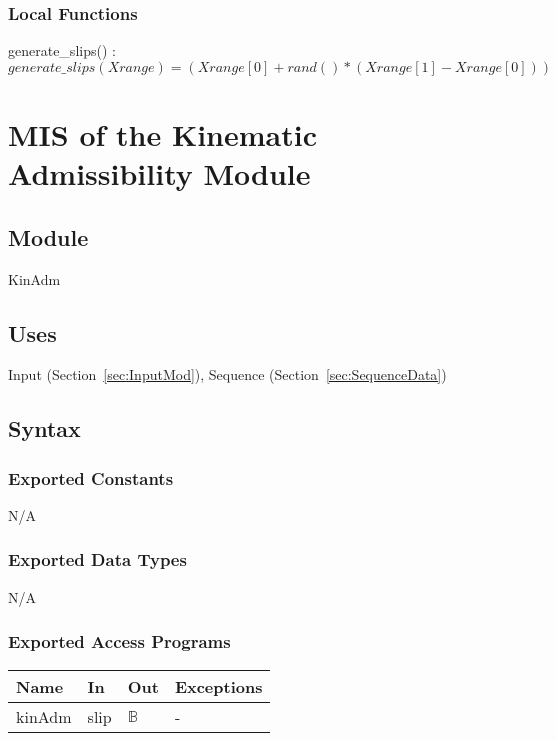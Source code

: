 \documentclass[12pt, titlepage]{article}
\begin{document}
\subsubsection{Local Functions}
generate\_slips() : 
\begin{equation*}
generate\_slips(Xrange) = (Xrange[0] + rand()*(Xrange[1] - Xrange[0]))
\end{equation*}


\section{MIS of the Kinematic Admissibility
	Module} \label{sec:KinAdmMod}

\subsection{Module}
KinAdm

\subsection{Uses}
Input (Section~\ref{sec:InputMod}), Sequence (Section~\ref{sec:SequenceData})

\subsection{Syntax}

\subsubsection{Exported Constants}
N/A

\subsubsection{Exported Data Types}
N/A

\subsubsection{Exported Access Programs}

\begin{center}
	\renewcommand*{\arraystretch}{1.5}
	\begin{tabular} {p{}  p{}  p{} 
			p{} } \hline 
		\textbf{Name} & \textbf{In} & \textbf{Out} & \textbf{Exceptions} \\ 
		\hline
		
		kinAdm & slip & $\mathbb{B}$ & - \\ \hline
		
	\end{tabular}
\end{center}
\end{document}
